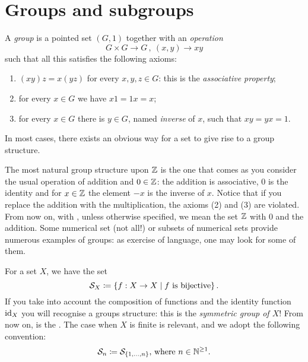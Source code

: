 
\section{Groups and subgroups}

A {\em group} is a pointed set \((G, 1)\) together with an {\em operation}
\[G \times G \to G \,, \ (x, y) \to x y\]
such that all this satisfies the following axioms:
\begin{enumerate}
\item \((xy)z = x(yz)\) for every \(x,y,z \in G\): this is the {\em associative property};
\item for every \(x \in G\) we have \(x1 = 1x = x\);
\item for every \(x \in G\) there is \(y \in G\), named {\em inverse} of \(x\), such that \(xy = yx = 1\).
\end{enumerate}

In most cases, there exists an obvious way for a set to give rise to a group structure.

\begin{example}
The most natural group structure upon \(\mathbb Z\) is the one that comes as you consider the usual operation of addition and \(0 \in \mathbb Z\): the addition is associative, \(0\) is the identity and for \(x \in \mathbb Z\) the element \(-x\) is the inverse of \(x\). Notice that if you replace the addition with the multiplication, the axioms (2) and (3) are violated. From now on, with , unless otherwise specified, we mean the set \(\mathbb Z\) with \(0\) and the addition.\newline
Some numerical set (not all!) or subsets of numerical sets provide numerous examples of groups: as exercise of language, one may look for some of them.
\end{example}

\begin{example}
For a set \(X\), we have the set
\[\mathcal S_X \coloneq \left\{f : X \to X \mid f \text{ is bijective}\right\} .\]
If you take into account the composition of functions and the identity function \(\text{id}_X\) you will recognise a groups structure: this is the {\em symmetric group of \(X\)}! From now on,  is the . The case when \(X\) is finite is relevant, and we adopt the following convention:
\[\mathcal S_n \coloneq \mathcal S_{\left\{1, \dots{}, n\right\}} \text{, where } n \in \mathbb N^{\ge 1} .\]
\end{example}


